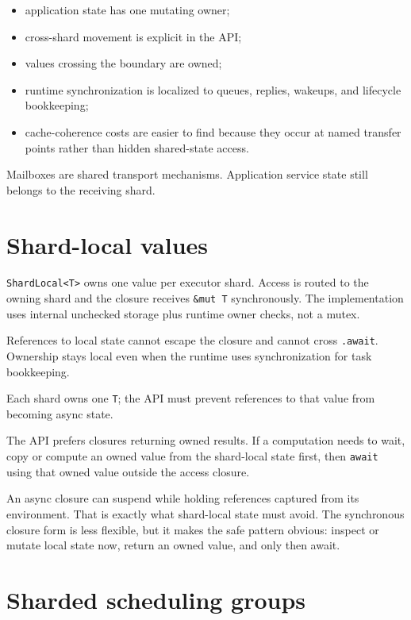 \begin{itemize}
    \item application state has one mutating owner;
    \item cross-shard movement is explicit in the API;
    \item values crossing the boundary are owned;
    \item runtime synchronization is localized to queues, replies, wakeups, and
          lifecycle bookkeeping;
    \item cache-coherence costs are easier to find because they occur at named
          transfer points rather than hidden shared-state access.
\end{itemize}

Mailboxes are shared transport mechanisms. Application service state still
belongs to the receiving shard.

\section{Shard-local values}

\texttt{ShardLocal<T>} owns one value per executor shard. Access is routed to
the owning shard and the closure receives \texttt{\&mut T} synchronously. The
implementation uses internal unchecked storage plus runtime owner checks, not a
mutex.

References to local state cannot escape the closure and cannot cross
\texttt{.await}. Ownership stays local even when the runtime uses
synchronization for task bookkeeping.

Each shard owns one \texttt{T}; the API must prevent references to that value
from becoming async state.

The API prefers closures returning owned results. If a computation needs to
wait, copy or compute an owned value from the shard-local state first, then
\texttt{await} using that owned value outside the access closure.

\begin{notabene}
An async closure can suspend while holding references captured from its
environment. That is exactly what shard-local state must avoid. The synchronous
closure form is less flexible, but it makes the safe pattern obvious: inspect
or mutate local state now, return an owned value, and only then await.
\end{notabene}

\section{Sharded scheduling groups}

